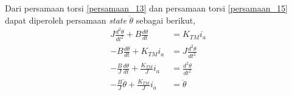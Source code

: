\documentclass[../cover.tex]{subfiles}
\begin{document}
            Dari persamaan torsi \eqref{persamaan_13} dan persamaan torsi \eqref{persamaan_15} dapat diperoleh persamaan \textit{state} $\ddot{\theta}$ sebagai berikut,
            \begin{equation}
                \begin{split}
                    J\frac{d^2\theta}{dt^2} + B\frac{d\theta}{dt} &= K_{TM} i_a \\[5pt]
                    -B \frac{d\theta}{dt} + K_{TM}i_a &= J\frac{d^2\theta}{dt^2} \\[5pt]
                    -\frac{B}{J}\frac{d\theta}{dt} + \frac{K_{TM}}{J}i_a &= \frac{d^2\theta}{dt^2} \\[5pt]
                    -\frac{B}{J}\dot{\theta} + \frac{K_{TM}}{J}i_a &= \ddot{\theta}
                    \label{persamaan_16}
                \end{split}
            \end{equation}
\end{document}
